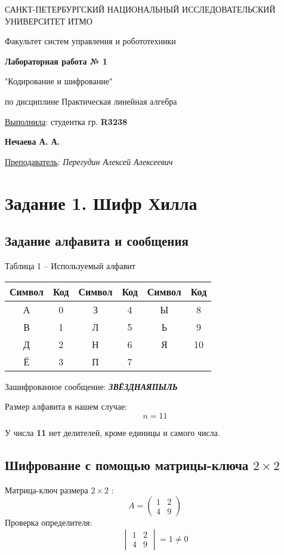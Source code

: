 \documentclass[a5paper, 10pt]{article}
\theoremstyle{definition}
\theoremstyle{plain}
\theoremstyle{remark}
\newcommand*{\titlePage}{
	\thispagestyle{title}
	\begingroup
	\begin{center}
		\vspace*{6ex}
		
		{\small
			САНКТ-ПЕТЕРБУРГСКИЙ НАЦИОНАЛЬНЫЙ ИССЛЕДОВАТЕЛЬСКИЙ УНИВЕРСИТЕТ ИТМО	
		}
		
		\vspace*{2ex}
		
		{\normalsize
			Факультет систем управления и робототехники
		}
		
		\vspace*{15ex}
		
		{\Large \bfseries 
			Лабораторная работа № 1
		}
\vspace*{2ex}
	{\Large \bfseries 
			
"Кодирование и шифрование"
		}
\vspace*{2ex}
		
		{\normalsize
			по дисциплине Практическая линейная алгебра
		}

	\end{center}
	\vspace*{20ex}
	\begin{flushright}
		{\large 
			\underline{Выполнила}: студентка гр. \textbf{R3238}\\
			\begin{flushright}
				\textbf{Нечаева А. А.}\\
			\end{flushright}
		}
		
		\vspace*{5ex}
		
		{\large 
			\underline{Преподаватель}: \textit{Перегудин Алексей Алексеевич}
		}
	\end{flushright}	
	\newpage
	\setcounter{page}{1}
	\endgroup}
\begin{document}
	\titlePage
	\pagestyle{style}
\newpage

\section{Задание 1. Шифр Хилла}
\subsection{Задание алфавита и сообщения}



\begin{center}
Таблица 1 -- Используемый алфавит\\
\begin{tabular}{ |c|c|c|c|c|c| } 
 \hline
Символ & Код & Символ & Код & Символ & Код\\
\hline
А & 0 & З  & 4 & Ы  & 8 \\
 \hline
В & 1 & Л & 5& Ь  & 9  \\
 \hline
Д & 2 & Н & 6& Я  & 10  \\
 \hline
Ё & 3 & П & 7&   &   \\
 \hline
\end{tabular}
\end{center}

Зашифрованное сообщение: \textbf{\textit{ЗВЁЗДНАЯПЫЛЬ}}

Размер алфавита в нашем случае: $$n = 11 $$

У числа  \textbf{11} нет делителей, кроме единицы и самого числа.

\subsection{Шифрование с помощью матрицы-ключа $2 \times 2$}
Матрица-ключ размера  $2 \times 2$ :
\begin{equation}
A =
\begin{pmatrix}
1 & 2 \\
4 & 9
\end{pmatrix}
\end{equation}
Проверка определителя:
\begin{equation}
\begin{vmatrix}
1 & 2 \\
4 & 9
\end{vmatrix}
= 1 \neq 0
\end{equation}
\end{document}
